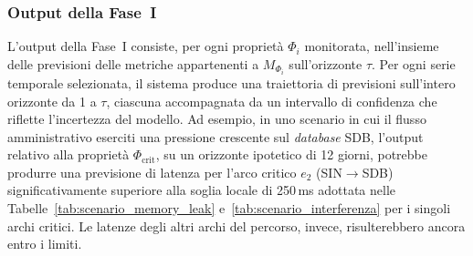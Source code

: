 \begin{table}[htbp]
\centering
\caption{Confronto tra i modelli predittivi adottati nel framework.}
\label{tab:modelli_predittivi}
\small
\setlength{\tabcolsep}{4pt}
\end{table}

\subsubsection{Output della Fase~I}
\label{sec:output_fase1}

L'output della Fase~I consiste, per ogni proprietà $\Phi_i$ monitorata, nell'insieme delle
previsioni delle metriche appartenenti a $M_{\Phi_i}$ sull'orizzonte $\tau$. Per ogni serie
temporale selezionata, il sistema produce una traiettoria di previsioni sull'intero orizzonte da 1
a $\tau$, ciascuna accompagnata da un intervallo di confidenza che riflette l'incertezza del
modello. Ad esempio, in uno scenario in cui il flusso amministrativo eserciti una pressione
crescente sul \textit{database} SDB, l'output relativo alla proprietà $\Phi_{\text{crit}}$, su un
orizzonte ipotetico di 12 giorni, potrebbe produrre una previsione di latenza per l'arco critico
$e_2$ (SIN$\to$SDB) significativamente superiore alla soglia locale di 250\,ms adottata nelle
Tabelle~\ref{tab:scenario_memory_leak} e~\ref{tab:scenario_interferenza} per i singoli archi
critici. Le latenze degli altri archi del percorso, invece, risulterebbero ancora entro i limiti.


